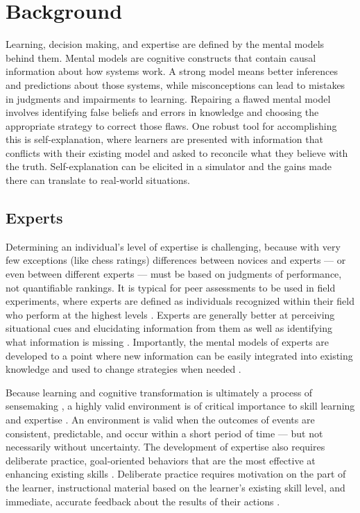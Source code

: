 
\chapter{Background}

Learning, decision making, and expertise are defined by the mental models behind them. Mental models are cognitive constructs that contain causal information about how systems work. A strong model means better inferences and predictions about those systems, while misconceptions can lead to mistakes in judgments and impairments to learning. Repairing a flawed mental model involves identifying false beliefs and errors in knowledge and choosing the appropriate strategy to correct those flaws. One robust tool for accomplishing this is self-explanation, where learners are presented with information that conflicts with their existing model and asked to reconcile what they believe with the truth. Self-explanation can be elicited in a simulator and the gains made there can translate to real-world situations.

\section{Experts}

Determining an individual's level of expertise is challenging, because with very few exceptions (like chess ratings) differences between novices and experts --- or even between different experts --- must be based on judgments of performance, not quantifiable rankings. It is typical for peer assessments to be used in field experiments, where experts are defined as individuals recognized within their field who perform at the highest levels \citep{Kahneman2009}. Experts are generally better at perceiving situational cues and elucidating information from them \citep{Nee2006, Klein1999} as well as identifying what information is missing \citep{Klein1992}. Importantly, the mental models of experts are developed to a point where new information can be easily integrated into existing knowledge and used to change strategies when needed \citep{Glaser1996}.

Because learning and cognitive transformation is ultimately a process of sensemaking \citep{Klein2006}, a highly valid environment is of critical importance to skill learning and expertise \citep{Kahneman2009}. An environment is valid when the outcomes of events are consistent, predictable, and occur within a short period of time --- but not necessarily without uncertainty. The development of expertise also requires deliberate practice, goal-oriented behaviors that are the most effective at enhancing existing skills \citep{Ericsson2008}. Deliberate practice requires motivation on the part of the learner, instructional material based on the learner's existing skill level, and immediate, accurate feedback about the results of their actions \citep{Ericsson1993}.

